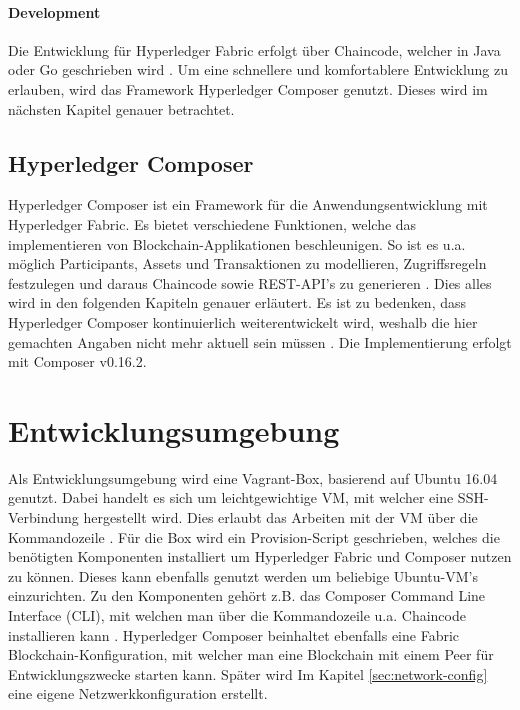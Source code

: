 \paragraph{Development}
Die Entwicklung für Hyperledger Fabric erfolgt über Chaincode, welcher in Java oder Go geschrieben wird \cite{HyperledgerFabricTeamSDKsHyperledgerFabric}. Um eine schnellere und komfortablere Entwicklung zu erlauben, wird das Framework Hyperledger Composer genutzt. Dieses wird im nächsten Kapitel genauer betrachtet.


\subsection{Hyperledger Composer}
Hyperledger Composer ist ein Framework für die Anwendungsentwicklung mit Hyperledger Fabric. Es bietet verschiedene Funktionen, welche das implementieren von Blockchain-Applikationen beschleunigen. So ist es u.a. möglich Participants, Assets und Transaktionen zu modellieren, Zugriffsregeln festzulegen und daraus Chaincode sowie REST-API's zu generieren \cite{HyperledgerComposerTeamIntroductionHyperledgerComposer}. Dies alles wird in den folgenden Kapiteln genauer erläutert. Es ist zu bedenken, dass Hyperledger Composer kontinuierlich weiterentwickelt wird, weshalb die hier gemachten Angaben nicht mehr aktuell sein müssen \cite{HyperledgerComposerTeamHyperledgerComposerReleases2018}. Die Implementierung erfolgt mit Composer v0.16.2.

\section{Entwicklungsumgebung}
Als Entwicklungsumgebung wird eine Vagrant-Box, basierend auf Ubuntu 16.04 genutzt. Dabei handelt es sich um leichtgewichtige VM, mit welcher eine SSH-Verbindung hergestellt wird. Dies erlaubt das Arbeiten mit der VM über die Kommandozeile \cite{VagrantTeamVagrantHashiCorp}. Für die Box wird ein Provision-Script geschrieben, welches die benötigten Komponenten installiert um Hyperledger Fabric und Composer nutzen zu können. Dieses kann ebenfalls genutzt werden um beliebige Ubuntu-VM's einzurichten. Zu den Komponenten gehört z.B. das Composer Command Line Interface (CLI), mit welchen man über die Kommandozeile u.a. Chaincode installieren kann \cite{HyperledgerComposerTeamDevelopmentEnvironmentHyperledger}. Hyperledger Composer beinhaltet ebenfalls eine Fabric Blockchain-Konfiguration, mit welcher man eine Blockchain mit einem Peer für Entwicklungszwecke starten kann. Später wird Im Kapitel \ref{sec:network-config} eine eigene Netzwerkkonfiguration erstellt.

